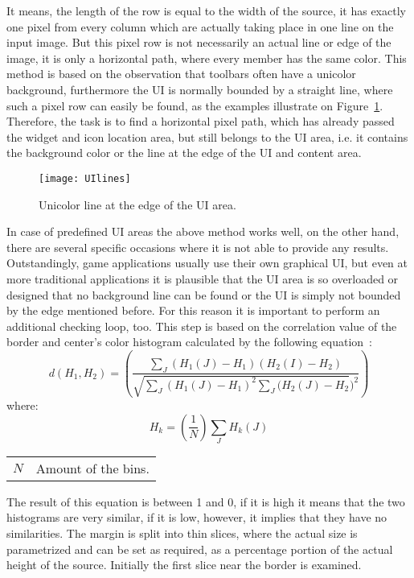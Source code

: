 \documentclass[draft,final]{vutinfth} %
\makeatletter
\newenvironment{conditions}
{\par\vspace{\abovedisplayskip}\noindent\begin{tabular}{>{$}l<{$} @{${}:{}$} l}}
	{\end{tabular}\par\vspace{\belowdisplayskip}}
\makeatother
\begin{document}
	It means, the length of the row is equal to the width of the source, it has exactly one pixel from every column which are actually taking place in one line on the input image.
	But this pixel row is not necessarily an actual line or edge of the image, it is only a horizontal path, where every member has the same color. 
	This method is based on the observation that toolbars often have a unicolor background, furthermore the UI is normally bounded by a straight line, where such a pixel row can easily be found, as the examples illustrate on Figure~\ref{fig:lines}.
	Therefore, the task is to find a horizontal pixel path, which has already passed the widget and icon location area, but still belongs to the UI area, i.e. it contains the background color or the line at the edge of the UI and content area.\par
	\begin{figure}[h]
		\centering		
		\texttt{[image: UIlines]}
		\caption{Unicolor line at the edge of the UI area.}
		\label{fig:lines}
	\end{figure}
	In case of predefined UI areas the above method works well, on the other hand, there are several specific occasions where it is not able to provide any results.
	Outstandingly, game applications usually use their own graphical UI, but even at more traditional applications it is plausible that the UI area is so overloaded or designed that no background line can be found or the UI is simply not bounded by the edge mentioned before.
	For this reason it is important to perform an additional checking loop, too.
	This step is based on the correlation value of the border and center's color histogram calculated by the following equation~\cite{compareHist}:
	\[ d(H_{1},H_{2})=\left(\frac{\sum\limits_{J}(H_{1}(J)-H_{1})(H_{2}(I)-H_{2})}{\sqrt{\sum\limits_{J}(H_{1}(J)-H_{1})^2\sum\limits_{J}(H_{2}(J)-H_{2}})^2}\right) \]
	where:
	\[H_{k}=\left(\frac{1}{N}\right)\sum\limits_{J}H_{k}(J)\]
	\begin{center}
		\begin{conditions}
			N & Amount of the bins. 
		\end{conditions}
	\end{center}
	The result of this equation is between 1 and 0, if it is high it means that the two histograms are very similar, if it is low, however, it implies that they have no similarities.
	The margin is split into thin slices, where the actual size is parametrized and can be set as required, as a percentage portion of the actual height of the source.
	Initially the first slice near the border is examined.
\end{document}
